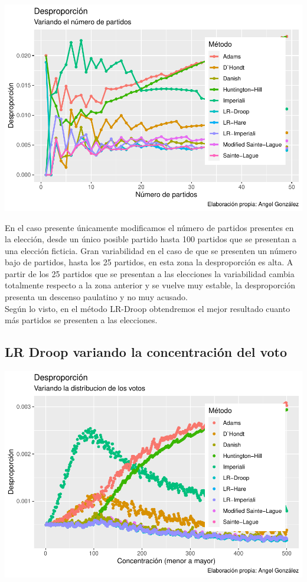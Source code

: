 \documentclass[12pt,a4paper,]{book}
\numberwithin{dummy}{section}
\theoremstyle{ocrenumbox}
\theoremstyle{blacknumex}
\theoremstyle{blacknumbox}
\theoremstyle{ocrenum}
\theoremstyle{ocrenum}
\begin{document}
\begin{center}\includegraphics[width=0.95\linewidth]{figurasR/unnamed-chunk-57-1} \end{center}

En el caso presente únicamente modificamos el número de partidos
presentes en la elección, desde un único posible partido hasta 100
partidos que se presentan a una elección ficticia. Gran variabilidad en
el caso de que se presenten un número bajo de partidos, hasta los 25
partidos, en esta zona la desproporción es alta. A partir de los 25
partidos que se presentan a las elecciones la variabilidad cambia
totalmente respecto a la zona anterior y se vuelve muy estable, la
desproporción presenta un descenso paulatino y no muy acusado.\\
Según lo visto, en el método LR-Droop obtendremos el mejor resultado
cuanto más partidos se presenten a las elecciones.

\hypertarget{lr-droop-variando-la-concentraciuxf3n-del-voto}{%
\subsection{LR Droop variando la concentración del
voto}\label{lr-droop-variando-la-concentraciuxf3n-del-voto}}

\begin{center}\includegraphics[width=0.95\linewidth]{figurasR/unnamed-chunk-58-1} \end{center}
\end{document}
